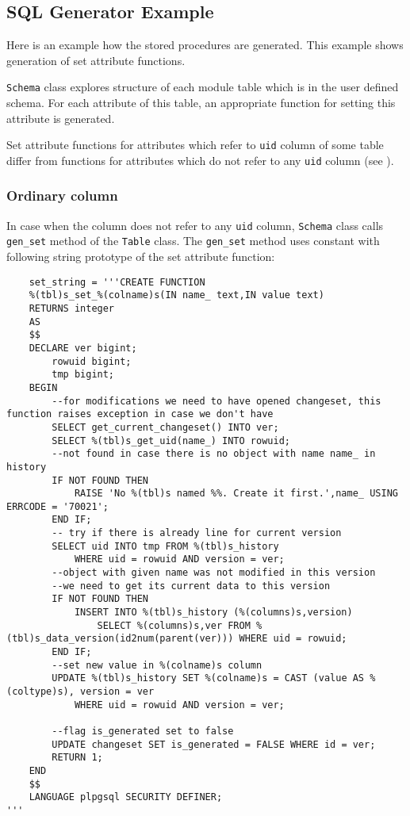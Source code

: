 \documentclass[deska]{subfiles}
\begin{document}
\subsection{SQL Generator Example}
\label{sec:sql-gen-example}

Here is an example how the stored procedures are generated.  This example shows generation of set attribute functions.

{\tt Schema} class explores structure of each module table which is in the user defined schema. For each attribute of
this table, an appropriate function for setting this attribute is generated.

Set attribute functions for attributes which refer to {\tt uid} column of some table differ from functions for
attributes which do not refer to any {\tt uid} column (see ).

\subsubsection{Ordinary column}
In case when the column does not refer to any {\tt uid} column, {\tt Schema} class calls {\tt gen\_set} method of the
{\tt Table} class. The {\tt gen\_set} method uses constant with following string prototype of the set attribute
function:

\begin{verbatim}
    set_string = '''CREATE FUNCTION 
    %(tbl)s_set_%(colname)s(IN name_ text,IN value text)
    RETURNS integer
    AS
    $$
    DECLARE ver bigint;
        rowuid bigint;
        tmp bigint;
    BEGIN
        --for modifications we need to have opened changeset, this function raises exception in case we don't have
        SELECT get_current_changeset() INTO ver;
        SELECT %(tbl)s_get_uid(name_) INTO rowuid;
        --not found in case there is no object with name name_ in history
        IF NOT FOUND THEN
            RAISE 'No %(tbl)s named %%. Create it first.',name_ USING ERRCODE = '70021';
        END IF;
        -- try if there is already line for current version
        SELECT uid INTO tmp FROM %(tbl)s_history
            WHERE uid = rowuid AND version = ver;
        --object with given name was not modified in this version
        --we need to get its current data to this version
        IF NOT FOUND THEN
            INSERT INTO %(tbl)s_history (%(columns)s,version)
                SELECT %(columns)s,ver FROM %(tbl)s_data_version(id2num(parent(ver))) WHERE uid = rowuid;
        END IF;
        --set new value in %(colname)s column
        UPDATE %(tbl)s_history SET %(colname)s = CAST (value AS %(coltype)s), version = ver
            WHERE uid = rowuid AND version = ver;

        --flag is_generated set to false
        UPDATE changeset SET is_generated = FALSE WHERE id = ver;
        RETURN 1;
    END
    $$
    LANGUAGE plpgsql SECURITY DEFINER;
'''
\end{verbatim}
\end{document}

